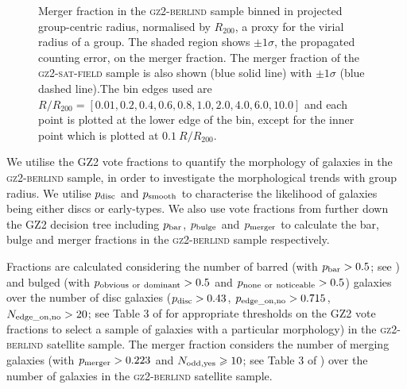 \documentclass[useAMS,usenatbib]{mn2e}
\begin{document}
\begin{figure}
\caption[Merger fraction with group radius in the \textsc{gz2-berlind} sample]{Merger fraction in the \textsc{gz2-berlind} sample binned in projected group-centric radius, normalised by $R_{200}$, a proxy for the virial radius of a group. The shaded region shows $\pm1\sigma$, the propagated counting error, on the merger fraction. The merger fraction of the \textsc{gz2-sat-field} sample is also shown (blue solid line) with $\pm1\sigma$ (blue dashed line).The bin edges used are $R/R_{200} =  [0.01 ,   0.2,   0.4,   0.6,   0.8,   1.0 ,   2.0 ,   4.0 ,   6.0 ,  10.0]$ and each point is plotted at the lower edge of the bin, except for the inner point which is plotted at $0.1~R/R_{200}$.}
\label{fig:mergerradius}
\end{figure}


We utilise the GZ2 vote fractions to quantify the morphology of galaxies in the \textsc{gz2-berlind} sample, in order to investigate the morphological trends with group radius. We utilise $p_{\rm{disc}}$ and $p_{\rm{smooth}}$ to characterise the likelihood of galaxies being either discs or early-types. We also use vote fractions from further down the GZ2 decision tree including $p_{\rm{bar}}$, $p_{\rm{bulge}}$ and $p_{\rm{merger}}$ to calculate the bar, bulge and merger fractions in the \textsc{gz2-berlind} sample respectively. 

Fractions are calculated considering the number of barred (with $p_{\rm{bar}} > 0.5$; see \citealt{masters11a, Cheung13}) and bulged (with $p_{\rm{obvious}~\rm{or}~\rm{dominant}} > 0.5$ and $p_{\rm{none}~\rm{or}~\rm{noticeable}} > 0.5$) galaxies over the number of disc galaxies ($p_{\rm{disc}} > 0.43$, $p_{\rm{edge\_on, no}} > 0.715$, $N_{\rm{edge\_on, no}} > 20$; see Table 3 of \citealt{GZ2} for appropriate thresholds on the GZ2 vote fractions to select a sample of galaxies with a particular morphology) in the \textsc{gz2-berlind} satellite sample. The merger fraction considers the number of merging galaxies (with $p_{\rm{merger}} > 0.223$ and $N_{\rm{odd, yes}}\geq10$; see Table 3 of \citealt{GZ2}) over the number of galaxies in the \textsc{gz2-berlind} satellite sample. 
\end{document}
